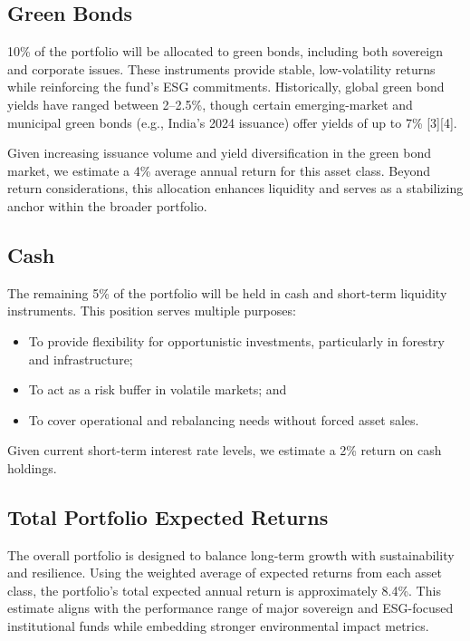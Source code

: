 \subsection{Green Bonds}
10\% of the portfolio will be allocated to green bonds, including both sovereign and corporate issues. These instruments provide stable, low-volatility returns while reinforcing the fund’s ESG commitments. Historically, global green bond yields have ranged between 2–2.5\%, though certain emerging-market and municipal green bonds (e.g., India’s 2024 issuance) offer yields of up to 7\% [3][4].
\par Given increasing issuance volume and yield diversification in the green bond market, we estimate a 4\% average annual return for this asset class. Beyond return considerations, this allocation enhances liquidity and serves as a stabilizing anchor within the broader portfolio.

\subsection{Cash}
The remaining 5\% of the portfolio will be held in cash and short-term liquidity instruments. This position serves multiple purposes: 
\begin{itemize}
    \item To provide flexibility for opportunistic investments, particularly in forestry and infrastructure;
    \item To act as a risk buffer in volatile markets; and 
    \item To cover operational and rebalancing needs without forced asset sales.
\end{itemize}
Given current short-term interest rate levels, we estimate a 2\% return on cash holdings.

\subsection{Total Portfolio Expected Returns}
The overall portfolio is designed to balance long-term growth with sustainability and resilience. Using the weighted average of expected returns from each asset class, the portfolio’s total expected annual return is approximately 8.4\%. This estimate aligns with the performance range of major sovereign and ESG-focused institutional funds while embedding stronger environmental impact metrics. 

